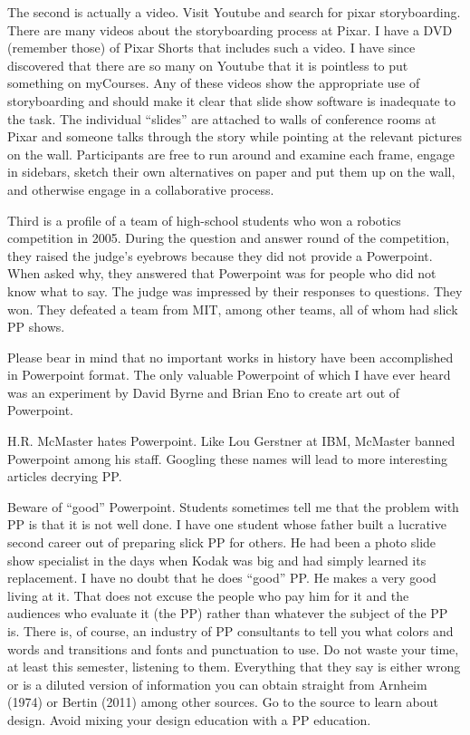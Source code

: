 The second is actually a video. Visit Youtube and search for pixar
storyboarding. There are many videos about the storyboarding process at
Pixar. I have a DVD (remember those) of Pixar Shorts that includes such
a video. I have since discovered that there are so many on Youtube that
it is pointless to put something on myCourses. Any of these videos show
the appropriate use of storyboarding and should make it clear that slide
show software is inadequate to the task. The individual ``slides'' are
attached to walls of conference rooms at Pixar and someone talks through
the story while pointing at the relevant pictures on the wall.
Participants are free to run around and examine each frame, engage in
sidebars, sketch their own alternatives on paper and put them up on the
wall, and otherwise engage in a collaborative process.

Third is a profile of a team of high-school students who won a robotics
competition in 2005. During the question and answer round of the
competition, they raised the judge's eyebrows because they did not
provide a Powerpoint. When asked why, they answered that Powerpoint was
for people who did not know what to say. The judge was impressed by
their responses to questions. They won. They defeated a team from MIT,
among other teams, all of whom had slick PP shows.

Please bear in mind that no important works in history have been
accomplished in Powerpoint format. The only valuable Powerpoint of which
I have ever heard was an experiment by David Byrne and Brian Eno to
create art out of Powerpoint.

H.R. McMaster hates Powerpoint. Like Lou Gerstner at IBM, McMaster
banned Powerpoint among his staff. Googling these names will lead to
more interesting articles decrying PP.

Beware of ``good'' Powerpoint. Students sometimes tell me that the
problem with PP is that it is not well done. I have one student whose
father built a lucrative second career out of preparing slick PP for
others. He had been a photo slide show specialist in the days when Kodak
was big and had simply learned its replacement. I have no doubt that he
does ``good'' PP. He makes a very good living at it. That does not
excuse the people who pay him for it and the audiences who evaluate it
(the PP) rather than whatever the subject of the PP is. There is, of
course, an industry of PP consultants to tell you what colors and words
and transitions and fonts and punctuation to use. Do not waste your
time, at least this semester, listening to them. Everything that they
say is either wrong or is a diluted version of information you can
obtain straight from Arnheim (1974) or Bertin (2011) among other
sources. Go to the source to learn about design. Avoid mixing your
design education with a PP education.


